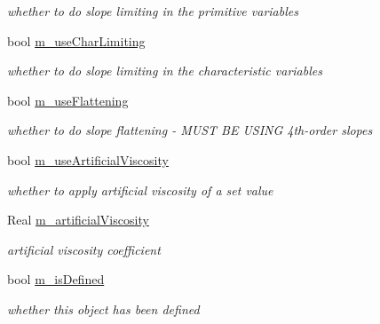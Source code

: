 \begin{DoxyCompactItemize}
\begin{DoxyCompactList}\small\item\em whether to do slope limiting in the primitive variables \end{DoxyCompactList}\item 
\hypertarget{class_level_advect_a586ff8dcb0832298bd962d061eb4ef56}{bool \hyperlink{class_level_advect_a586ff8dcb0832298bd962d061eb4ef56}{m\-\_\-use\-Char\-Limiting}}\label{class_level_advect_a586ff8dcb0832298bd962d061eb4ef56}

\begin{DoxyCompactList}\small\item\em whether to do slope limiting in the characteristic variables \end{DoxyCompactList}\item 
\hypertarget{class_level_advect_a14bfed42bbb2388494f60443ec92d4db}{bool \hyperlink{class_level_advect_a14bfed42bbb2388494f60443ec92d4db}{m\-\_\-use\-Flattening}}\label{class_level_advect_a14bfed42bbb2388494f60443ec92d4db}

\begin{DoxyCompactList}\small\item\em whether to do slope flattening -\/ M\-U\-S\-T B\-E U\-S\-I\-N\-G 4th-\/order slopes \end{DoxyCompactList}\item 
\hypertarget{class_level_advect_a3971ab078e31ce2d6815e813583804a5}{bool \hyperlink{class_level_advect_a3971ab078e31ce2d6815e813583804a5}{m\-\_\-use\-Artificial\-Viscosity}}\label{class_level_advect_a3971ab078e31ce2d6815e813583804a5}

\begin{DoxyCompactList}\small\item\em whether to apply artificial viscosity of a set value \end{DoxyCompactList}\item 
\hypertarget{class_level_advect_a3555480c3e66811829d48d3ace711dbc}{Real \hyperlink{class_level_advect_a3555480c3e66811829d48d3ace711dbc}{m\-\_\-artificial\-Viscosity}}\label{class_level_advect_a3555480c3e66811829d48d3ace711dbc}

\begin{DoxyCompactList}\small\item\em artificial viscosity coefficient \end{DoxyCompactList}\item 
\hypertarget{class_level_advect_a3f6eda4ee5c690fa4c2ca76404510f0a}{bool \hyperlink{class_level_advect_a3f6eda4ee5c690fa4c2ca76404510f0a}{m\-\_\-is\-Defined}}\label{class_level_advect_a3f6eda4ee5c690fa4c2ca76404510f0a}

\begin{DoxyCompactList}\small\item\em whether this object has been defined \end{DoxyCompactList}\end{DoxyCompactItemize}


